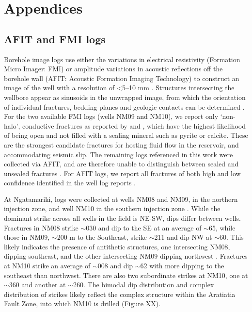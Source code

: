 \section{Appendices}
\subsection{AFIT and FMI logs}
Borehole image logs use either the variations in electrical resistivity (Formation Micro Imager: FMI) or amplitude variations in acoustic reflections off the borehole wall (AFIT: Acoustic Formation Imaging Technology) to construct an image of the well with a resolution of \textless5--10 mm \citep{massiot2015processing,McNamara_2015}. Structures intersecting the wellbore appear as sinusoids in the unwrapped image, from which the orientation of individual fractures, bedding planes and geologic contacts can be determined \citep{massiot2015processing}. For the two available FMI logs (wells NM09 and NM10), we report only `non-halo', conductive fractures as reported by \citet{nm09_report} and \citet{nm10_report}, which have the highest likelihood of being open and not filled with a sealing mineral such as pyrite or calcite. These are the strongest candidate fractures for hosting fluid flow in the reservoir, and accommodating seismic slip. The remaining logs referenced in this work were collected via AFIT, and are therefore unable to distinguish between sealed and unsealed fractures \citep{massiot_2012,massiot2015processing}. For AFIT logs, we report all fractures of both high and low confidence identified in the well log reports \citep{massiot_2012,massiot_rk18l2,massiot_rk32,mcnamara2011rk29,mcnamara2010rk30l1}.

At Ngatamariki, logs were collected at wells NM08 and NM09, in the northern injection zone, and well NM10 in the southern injection zone \citep{massiot_2012,nm09_report,nm10_report}. While the dominant strike across all wells in the field is NE-SW, dips differ between wells. Fractures in NM08 strike $\sim$030\textdegree{} and dip to the SE at an average of $\sim$65\textdegree{}, while those in NM09, $\sim$200 m to the Southeast, strike $\sim$211\textdegree{} and dip NW at $\sim$60\textdegree{}. This likely indicates the presence of antithetic structures, one intersecting NM08, dipping southeast, and the other intersecting NM09 dipping northwest \citep{massiot_2012,nm09_report}. Fractures at NM10 strike an average of $\sim$008\textdegree{} and dip $\sim$62\textdegree{} with more dipping to the southeast than northwest. There are also two subordinate strikes at NM10, one at $\sim$360\textdegree{} and another at $\sim$260\textdegree{}. The bimodal dip distribution and complex distribution of strikes likely reflect the complex structure within the Aratiatia Fault Zone, into which NM10 is drilled (Figure XX).

